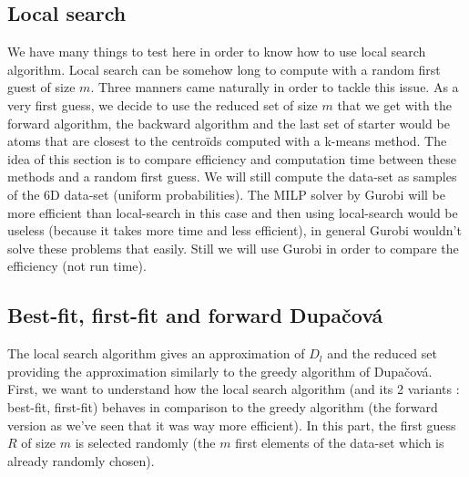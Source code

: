\documentclass{amsart}
\begin{document}
\subsection{Local search}
We have many things to test here in order to know how to use local search algorithm. Local search can be somehow long to compute with a random first guest of size $m$. Three manners came naturally in order to tackle this issue. As a very first guess, we decide to use the reduced set of size $m$ that we get with the forward algorithm, the backward algorithm and the last set of starter would be atoms that are closest to the centroïds computed with a k-means method. The idea of this section is to compare efficiency and computation time between these methods and a random first guess. We will still compute the data-set as samples of the 6D data-set (uniform probabilities). The MILP solver by Gurobi will be more efficient than local-search in this case and then using local-search would be useless (because it takes more time and less efficient), in general Gurobi wouldn't solve these problems that easily. Still we will use Gurobi in order to compare the efficiency (not run time).
\subsection{Best-fit, first-fit and forward Dupačová}
The local search algorithm gives an approximation of $D_l$ and the reduced set providing the approximation similarly to the greedy algorithm of Dupačová. First, we want to understand how the local search algorithm (and its 2 variants : best-fit, first-fit) behaves in comparison to the greedy algorithm (the forward version as we've seen that it was way more efficient). In this part, the first guess $R$ of size $m$ is selected randomly (the $m$ first elements of the data-set which is already randomly chosen).
\end{document}
